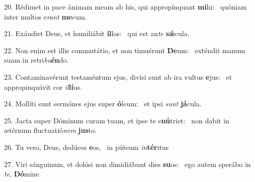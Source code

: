 20. Rédimet in pace ánimam meam ab his, qui appropínquant \textbf{mi}hi: \ast\  quóniam inter multos e\textit{rant} \textbf{me}cum.\

21. Exáudiet Deus, et humiliábit \textbf{il}los: \ast\  qui est an\textit{te} \textbf{sǽ}cula.\

22. Non enim est illis commutátio, et non timuérunt \textbf{De}um: \ast\  exténdit manum suam in retri\textit{bu}\textbf{én}do.\

23. Contaminavérunt testaméntum ejus, divísi sunt ab ira vultus \textbf{e}jus: \ast\  et appropinquávit cor \textit{il}\textbf{lí}us.\

24. Mollíti sunt sermónes ejus super \textbf{ó}leum: \ast\  et ipsi \textit{sunt} \textbf{já}cula.\

25. Jacta super Dóminum curam tuam, et ipse te e\textbf{nú}triet: \ast\  non dabit in ætérnum fluctuatió\textit{nem} \textbf{jus}to.\

26. Tu vero, Deus, dedúces \textbf{e}os, \ast\  in púteum \textit{in}\textbf{tér}itus\

27. Viri sánguinum, et dolósi non dimidiábunt dies \textbf{su}os: \ast\  ego autem sperábo in \textit{te}, \textbf{Dó}mine.\


